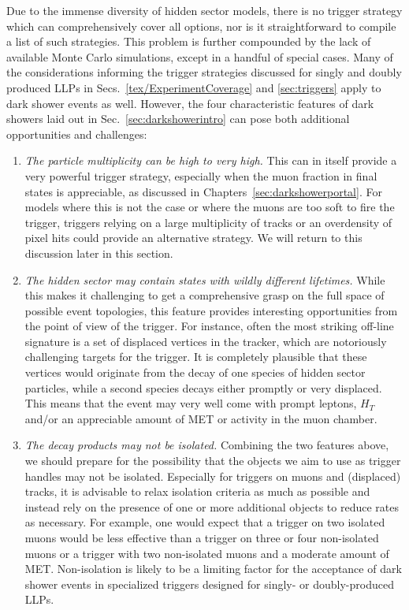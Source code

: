 Due to the immense diversity of hidden sector models, there is no trigger strategy which can comprehensively cover all options, nor is it straightforward to compile a list of such strategies. This problem is further compounded by the lack of available Monte Carlo simulations, except in a handful of special cases.
Many of the considerations informing the trigger strategies discussed for singly and doubly produced LLPs in Secs.~\ref{tex/ExperimentCoverage} and \ref{sec:triggers}  apply to dark shower events as well.  However, the four characteristic features of dark showers laid out in Sec.~\ref{sec:darkshowerintro} can pose both additional opportunities and challenges:
\begin{enumerate}
\item \emph{The particle multiplicity can be high to very high.} This can in itself provide a very powerful trigger strategy, especially when the muon fraction in final states is appreciable, as discussed in Chapters~\ref{sec:darkshowerportal}. For models where this is not the case or where the muons are too soft to fire the trigger, triggers relying on a large multiplicity of tracks or an overdensity of pixel hits could provide an alternative strategy. We will return to this discussion later in this section.

\item \emph{The hidden sector may contain states with wildly different lifetimes.} While this makes it  challenging to get a comprehensive grasp on the full space of possible event topologies, this feature provides interesting opportunities from the point of view of the trigger. For instance, often the most striking off-line signature is a set of displaced vertices in the tracker, which are notoriously challenging targets for the trigger. It is completely plausible that these vertices would originate from the decay of one species of hidden sector particles, while a second species decays either promptly or very displaced. This means that the event may very well come with prompt leptons, $H_T$ and/or an appreciable amount of MET or activity in the muon chamber.

\item \emph{The decay products may not be isolated.} Combining the two features above, we should prepare for the possibility that the objects we aim to use as trigger handles may not be isolated.  Especially for triggers on muons and (displaced) tracks, it is advisable to relax  isolation criteria as much as possible and instead rely on the presence of one or more additional objects to reduce rates as necessary. For example, one would expect that a trigger on two isolated muons would be less effective than a trigger on three or four non-isolated muons or a trigger with two non-isolated muons and a moderate amount of MET.  Non-isolation is likely to be a limiting factor for the acceptance of dark shower events in specialized triggers designed for singly- or doubly-produced LLPs.


\end{enumerate}
